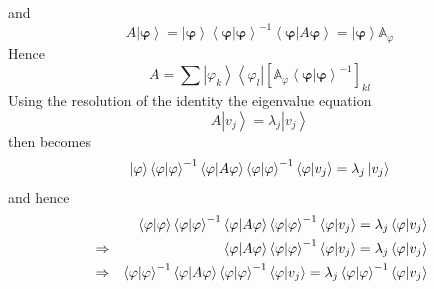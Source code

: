 \documentclass[aps,preprint]{revtex4}
\begin{document}
and 
\begin{equation}
A\left\vert \mathbf{\varphi }\right\rangle =\left\vert \mathbf{\varphi }%
\right\rangle \left\langle \mathbf{\varphi }|\mathbf{\varphi }\right\rangle
^{-1}\left\langle \mathbf{\varphi |}A\mathbf{\varphi }\right\rangle
=\left\vert \mathbf{\varphi }\right\rangle \mathbb{A}_{\varphi }
\end{equation}%
Hence 
\begin{equation}
A=\sum \left\vert \varphi _{k}\right\rangle \left\langle \varphi
_{l}\right\vert \left[ \mathbb{A}_{\varphi }\left\langle \mathbf{\varphi }|%
\mathbf{\varphi }\right\rangle ^{-1}\right] _{kl}
\end{equation}%
Using the resolution of the identity the eigenvalue equation 
\begin{equation}
A\left\vert v_{j}\right\rangle =\lambda _{j}\left\vert v_{j}\right\rangle
\end{equation}%
then becomes 
\begin{equation}
\left\vert \mathbf{\varphi }\right\rangle \left\langle \mathbf{\varphi }|%
\mathbf{\varphi }\right\rangle ^{-1}\left\langle \mathbf{\varphi |}A\mathbf{%
\varphi }\right\rangle \left\langle \mathbf{\varphi }|\mathbf{\varphi }%
\right\rangle ^{-1}\left\langle \mathbf{\varphi }|v_{j}\right\rangle
=\lambda _{j}\left\vert v_{j}\right\rangle
\end{equation}%
and hence 
\begin{eqnarray}
&&\left\langle \mathbf{\varphi }|\mathbf{\varphi }\right\rangle \left\langle 
\mathbf{\varphi }|\mathbf{\varphi }\right\rangle ^{-1}\left\langle \mathbf{%
\varphi |}A\mathbf{\varphi }\right\rangle \left\langle \mathbf{\varphi }|%
\mathbf{\varphi }\right\rangle ^{-1}\left\langle \mathbf{\varphi }%
|v_{j}\right\rangle =\lambda _{j}\left\langle \mathbf{\varphi }%
|v_{j}\right\rangle  \notag \\
&\Rightarrow &\left\langle \mathbf{\varphi |}A\mathbf{\varphi }\right\rangle
\left\langle \mathbf{\varphi }|\mathbf{\varphi }\right\rangle
^{-1}\left\langle \mathbf{\varphi }|v_{j}\right\rangle =\lambda
_{j}\left\langle \mathbf{\varphi }|v_{j}\right\rangle  \notag \\
&\Rightarrow &\left\langle \mathbf{\varphi }|\mathbf{\varphi }\right\rangle
^{-1}\left\langle \mathbf{\varphi |}A\mathbf{\varphi }\right\rangle
\left\langle \mathbf{\varphi }|\mathbf{\varphi }\right\rangle
^{-1}\left\langle \mathbf{\varphi }|v_{j}\right\rangle =\lambda
_{j}\left\langle \mathbf{\varphi }|\mathbf{\varphi }\right\rangle
^{-1}\left\langle \mathbf{\varphi }|v_{j}\right\rangle
\end{eqnarray}%
\end{document}

